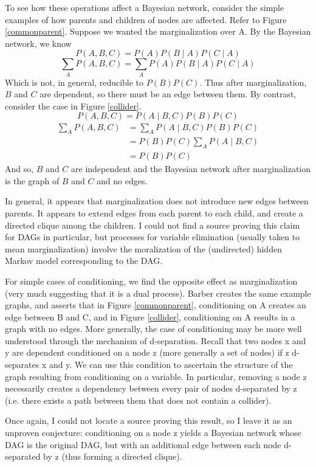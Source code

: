 \documentclass{article}
\begin{document}
	To see how these operations affect a Bayesian network, consider the simple examples of how parents and children of nodes are affected. Refer to Figure \ref{commonparent}. Suppose we wanted the marginalization over A. By the Bayesian network, we know
	$$
	P(A, B, C) = P(A)P(B \mid A)P(C \mid A)
	$$
	$$
	\sum_A{P(A, B, C)} = \sum_A{P(A)P(B \mid A)P(C \mid A)}
	$$
	Which is not, in general, reducible to $P(B)P(C)$. Thus after marginalization, $B$ and $C$ are dependent, so there must be an edge between them. By contrast, consider the case in Figure \ref{collider}.
	$$
	P(A, B, C) = P(A \mid B, C)P(B)P(C)
	$$
	\[
	\begin{array}{ll}
	\sum_A{P(A, B, C)} & = \sum_A{P(A \mid B, C)P(B)P(C)} \\
					   & = P(B)P(C) \sum_A{P(A \mid B, C)} \\
					   & = P(B)P(C)
	\end{array}
	\]
	And so, $B$ and $C$ are independent and the Bayesian network after marginalization is the graph of $B$ and $C$ and no edges.
	
	In general, it appears that marginalization does not introduce new edges between parents. It appears to extend edges from each parent to each child, and create a directed clique among the children. I could not find a source proving this claim for DAGs in particular, but processes for variable elimination (usually taken to mean marginalization) involve the moralization of the (undirected) hidden Markov model corresponding to the DAG\cite{kollerVarElim}.
	
	For simple cases of conditioning, we find the opposite effect as marginalization (very much suggesting that it is a dual process).
	Barber\cite{barberBRML2012} creates the same example graphs, and asserts that in Figure \ref{commonparent}, conditioning on A creates an edge between B and C, and in Figure \ref{collider}, conditioning on A results in a graph with no edges.
	More generally, the case of conditioning may be more well understood through the mechanism of d-separation.
	Recall that two nodes x and y are dependent conditioned on a node z (more generally a set of nodes) if z d-separates x and y.
	We can use this condition to ascertain the structure of the graph resulting from conditioning on a variable.
	In particular, removing a node z necessarily creates a dependency between every pair of nodes d-separated by z (i.e. there exists a path between them that does not contain a collider).
	
	Once again, I could not locate a source proving this result, so I leave it as an unproven conjecture: conditioning on a node z yields a Bayesian network whose DAG is the original DAG, but with an additional edge between each node d-separated by z (thus forming a directed clique).
	
\end{document}
